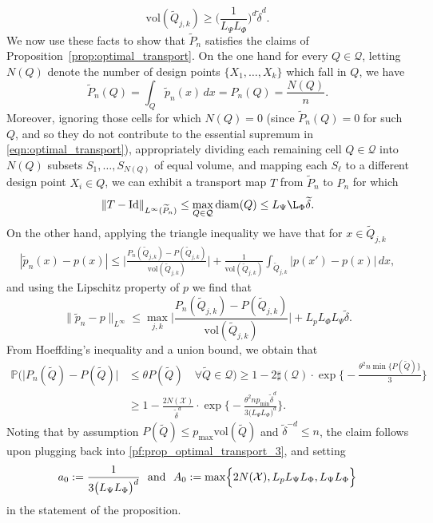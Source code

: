 \documentclass[twoside]{article}
\newcommand{\diam}{\mathrm{diam}}
\newcommand{\vol}{\text{vol}}
\newcommand{\1}{\mathbf{1}}
\newcommand{\Xset}{\mathcal{X}}
\newcommand{\Leb}{L}
\newcommand{\mc}[1]{\mathcal{#1}}
\newcommand{\wt}[1]{\widetilde{#1}}
\theoremstyle{definition}
\theoremstyle{remark}
\begin{document}
\begin{equation}
\label{pf:prop_optimal_transport_2}
\vol(\wt{Q}_{j,k}) \geq \biggl(\frac{1}{L_{\Psi} L_{\Phi}}\biggr)^d \wt{\delta}^d.
\end{equation}
We now use these facts to show that $\wt{P}_n$ satisfies the claims of Proposition~\ref{prop:optimal_transport}. On the one hand for every $Q \in \mc{Q}$, letting $N(Q)$ denote the number of design points $\{X_1,\ldots,X_k\}$ which fall in $Q$, we have
\begin{equation*}
\wt{P}_n(Q) = \int_{Q} \wt{p}_n(x) \,dx = P_n(Q) = \frac{N(Q)}{n}.
\end{equation*}
Moreover, ignoring those cells for which $N(Q) = 0$ (since $\wt{P}_n(Q) = 0$ for such $Q$, and so they do not contribute to the essential supremum in \eqref{eqn:optimal_transport}), appropriately dividing each remaining cell $Q \in \mc{Q}$ into $N(Q)$ subsets $S_1,\ldots,S_{N(Q)}$ of equal volume, and mapping each $S_{\ell}$ to a different design point $X_i \in Q$, we can exhibit a transport map $T$ from $\wt{P}_n$ to $P_n$ for which
\begin{equation*}
\|T - \mathrm{Id}\|_{L^{\infty}(\wt{P}_n)} \leq \max_{Q \in \mc{Q}} \diam(Q) \leq   L_{\Psi} \L_{\Phi} \wt{\delta}.
\end{equation*}
On the other hand, applying the triangle inequality we have that for $x \in \wt{Q}_{j,k}$
\begin{align*}
|\wt{p}_n(x) - p(x)| \leq \biggl|\frac{P_n(\wt{Q}_{j,k}) - P(\wt{Q}_{j,k})}{\vol(\wt{Q}_{j,k})}\biggr| + \frac{1}{\vol(\wt{Q}_{j,k})} \int_{\wt{Q}_{j,k}} |p(x') - p(x)| \,dx,
\end{align*}
and using the Lipschitz property of $p$ we find that 
\begin{equation}
\label{pf:prop_optimal_transport_3}
\|\wt{p}_n - p\|_{\Leb^{\infty}} \leq \max_{j,k} \biggl|\frac{P_n(\wt{Q}_{j,k}) - P(\wt{Q}_{j,k})}{\vol(\wt{Q}_{j,k})}\biggr| + L_p L_{\Phi} L_{\Psi} \wt{\delta}.
\end{equation}
From Hoeffding's inequality and a union bound, we obtain that 
\begin{align*}
\mathbb{P}\biggl( \bigl|P_n(\wt{Q}) - P(\wt{Q})\bigr| & \leq \theta P(\wt{Q}) \quad \forall \wt{Q} \in \mc{Q} \biggr) \geq 1 - 2 \sharp(\mc{Q}) \cdot \exp\biggl\{-\frac{\theta^2 n \min \{P(\wt{Q})\}}{3}\biggr\} \\
& \geq 1 - \frac{2 N(\Xset)}{\wt{\delta}^d} \cdot \exp\biggl\{-\frac{\theta^2 n p_{\min} \wt{\delta}^d }{3\bigl(L_{\Psi} L_{\Phi}\bigr)^d}\biggr\}.
\end{align*}
Noting that by assumption $P(\wt{Q}) \leq p_{\max} \vol(\wt{Q})$ and $\wt{\delta}^{-d} \leq n$, the claim follows upon plugging back into \eqref{pf:prop_optimal_transport_3}, and setting
\begin{equation*}
a_0 := \frac{1}{3\bigl(L_{\Psi} L_{\Phi}\bigr)^d}~~\textrm{and}~~A_0 := \max \Bigl\{2N(\Xset),L_p L_{\Psi} L_{\Phi}, L_{\Psi} L_{\Phi}\Bigr\}
\end{equation*}
in the statement of the proposition.
\end{document}
